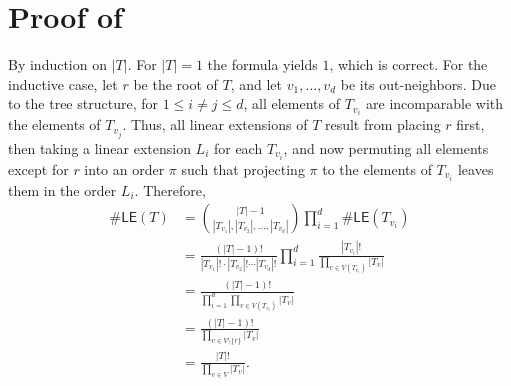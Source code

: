 \documentclass[11pt]{amsart}
\begin{document}
\section{Proof of~} \label{subsec:hook_length}
    By induction on $|T|$. For $|T| = 1$ the formula yields $1$, which is correct. For the inductive case, let $r$ be the root of $T$, and let $v_1, \dots, v_d$ be its out-neighbors. Due to the tree structure, for $1 \leq i \neq j \leq d$, all elements of $T_{v_i}$ are incomparable with the elements of $T_{v_j}$. Thus, all linear extensions of $T$ result from placing $r$ first, then taking a linear extension $L_i$ for each $T_{v_i}$, and now permuting all elements except for $r$ into an order $\pi$ such that projecting $\pi$ to the elements of $T_{v_i}$ leaves them in the order $L_i$. Therefore,
    \begin{align*}
         \#\mathsf{LE}(T) &= \binom{|T| - 1}{|T_{v_1}|, |T_{v_2}|, \dots, |T_{v_d}|} \prod_{i=1}^d \#\mathsf{LE}(T_{{v_i}})\\
         &=  \frac{(|T|-1)!}{ |T_{v_1}|! \cdot |T_{v_2}|! \cdots |T_{v_d}|!}  \prod_{i=1}^d \frac{|T_{v_i}|!}{\prod_{v \in V(T_{v_i})} |T_v|} \tag{Inductive Hypothesis} \\
         &= \frac{(|T| - 1)!}{\prod_{i=1}^d \prod_{v \in V(T_{v_i})} |T_v|}\\
         &= \frac{(|T| - 1)!}{\prod_{v \in V \setminus \{r \}} |T_v|} \\ &= \frac{|T|!}{\prod_{v \in V} |T_v|}.
    \end{align*}
\end{document}
